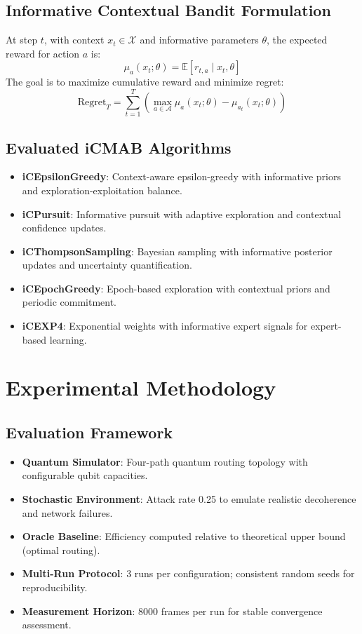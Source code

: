\documentclass[12pt,a4paper]{article}
\begin{document}
\subsection{Informative Contextual Bandit Formulation}
At step $t$, with context $x_t \in \mathcal{X}$ and informative parameters $\theta$, the expected reward for action $a$ is:
\[
\mu_a(x_t; \theta) = \mathbb{E}[r_{t,a} \mid x_t, \theta]
\]
The goal is to maximize cumulative reward and minimize regret:
\[
\mathrm{Regret}_T = \sum_{t=1}^{T}\left(\max_{a \in \mathcal{A}} \mu_a(x_t;\theta) - \mu_{a_t}(x_t;\theta)\right)
\]

\subsection{Evaluated iCMAB Algorithms}
\begin{itemize}
\item \textbf{iCEpsilonGreedy}: Context-aware epsilon-greedy with informative priors and exploration-exploitation balance.
\item \textbf{iCPursuit}: Informative pursuit with adaptive exploration and contextual confidence updates.
\item \textbf{iCThompsonSampling}: Bayesian sampling with informative posterior updates and uncertainty quantification.
\item \textbf{iCEpochGreedy}: Epoch-based exploration with contextual priors and periodic commitment.
\item \textbf{iCEXP4}: Exponential weights with informative expert signals for expert-based learning.
\end{itemize}

\section{Experimental Methodology}

\subsection{Evaluation Framework}
\begin{itemize}
\item \textbf{Quantum Simulator}: Four-path quantum routing topology with configurable qubit capacities.
\item \textbf{Stochastic Environment}: Attack rate 0.25 to emulate realistic decoherence and network failures.
\item \textbf{Oracle Baseline}: Efficiency computed relative to theoretical upper bound (optimal routing).
\item \textbf{Multi-Run Protocol}: 3 runs per configuration; consistent random seeds for reproducibility.
\item \textbf{Measurement Horizon}: 8000 frames per run for stable convergence assessment.
\end{itemize}
\end{document}
